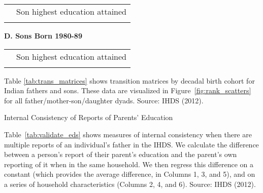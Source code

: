 \begin{table}[H]
{\begin{center}
\begin{tabular}{c |c c c c c c c}
              \hline
              \hline
              & \multicolumn{7}{c}{Son highest education attained} \\
              \tiny  
              \hline
              \tiny  
              \hline 
            \end{tabular}
          \end{center}

          \begin{center}
            \textbf{D. Sons Born 1980-89} 
          \end{center}

          \begin{center}
            \begin{tabular}{c | c c c c c c c}
              \hline
              \hline
              & \multicolumn{7}{c}{Son highest education attained} \\
              \tiny  
              \hline
              \tiny  
              \hline 
            \end{tabular}
          \end{center}
        }
\vspace{-.4cm} 
        \footnotesize{Table \ref{tab:trans_matrices} shows transition matrices by decadal birth
        cohort for Indian fathers and sons. These data are visualized in Figure~\ref{fig:rank_scatters} for all father/mother-son/daughter dyads.  Source: IHDS (2012).}

\end{table}

\begin{table}[H]
  \caption{Internal Consistency of Reports of Parents' Education}
  \label{tab:validate_eds}
  

    \footnotesize{Table~\ref{tab:validate_eds} shows measures of
      internal consistency when there are multiple reports of an
      individual's father in the IHDS. We calculate the difference between a person's report of their parent's education and the parent's own reporting of it when in the same household. We then regress this difference on a constant (which provides the average difference, in Columns 1, 3, and 5), and on a series of household characteristics (Columns 2, 4, and 6). Source: IHDS (2012).}
\end{table}

